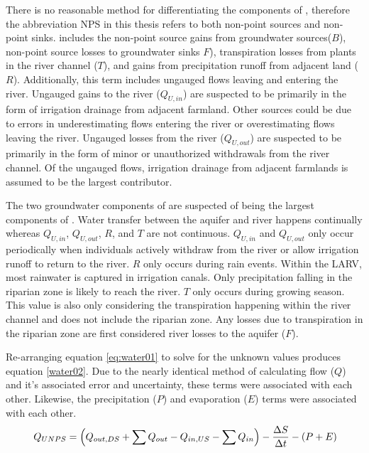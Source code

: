 \begin{linenumbers}
There is no reasonable method for differentiating the components of \Qnps, therefore the abbreviation NPS in this thesis refers to both non-point sources and non-point sinks.   \Qnps includes the non-point source gains from groundwater sources($ B $), non-point source losses to groundwater sinks {}$ F $), transpiration losses from plants in the river channel ($ T $), and gains from precipitation runoff from adjacent land ($ R $).  Additionally, this term includes ungauged flows leaving and entering the river.  Ungauged gains to the river ($ Q_{U,in} $) are suspected to be primarily in the form of irrigation drainage from adjacent farmland.  Other sources could be due to errors in underestimating flows entering the river or overestimating flows leaving the river.  Ungauged losses from the river ($ Q_{U,out} $) are suspected to be primarily in the form of minor or unauthorized withdrawals from the river channel.  Of the ungauged flows, irrigation drainage from adjacent farmlands is assumed to be the largest contributor.

The two groundwater components of \Qnps are suspected of being the largest components of \Qnps.  Water transfer between the aquifer and river happens continually whereas $ Q_{U,in} $, $ Q_{U,out} $, $ R $, and $ T $ are not continuous.  $ Q_{U,in} $ and $ Q_{U,out} $ only occur periodically when individuals actively withdraw from the river or allow irrigation runoff to return to the river.  $ R $ only occurs during rain events.  Within the LARV, most rainwater is captured in irrigation canals.  Only precipitation falling in the riparian zone is likely to reach the river.  $ T $ only occurs during growing season.  This value is also only considering the transpiration happening within the river channel and does not include the riparian zone.  Any losses due to transpiration in the riparian zone are first considered river losses to the aquifer ($ F $).


Re-arranging equation \eqref{eq:water01} to solve for the unknown values produces equation \ref{water02}.  Due to the nearly identical method of calculating flow ($ Q $) and it's associated error and uncertainty, these terms were associated with each other.  Likewise, the precipitation ($ P $) and evaporation ($ E $) terms were associated with each other.
\begin{equation}\
Q_{UNPS} = \left( Q_{out,DS} + \sum Q_{out} - Q_{in,US} - \sum Q_{in} \right) - \frac{\Delta S}{\Delta t} - \left( P + E \right)\\ \label{water02}
\end{equation}


\end{linenumbers}
